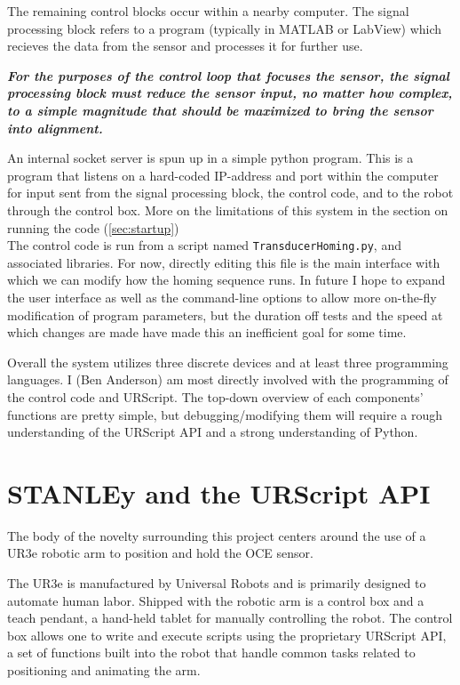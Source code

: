 \documentclass[11pt]{article}
\begin{document}
The remaining control blocks occur within a nearby computer. The signal processing block refers to a program (typically in MATLAB or LabView) which recieves the data from the sensor and processes it for further use. 

\textbf{\textit{For the purposes of the control loop that focuses the sensor, the signal processing block must reduce the sensor input, no matter how complex, to a simple magnitude that should be maximized to bring the sensor into alignment.}}

An internal socket server is spun up in a simple python program. This is a program that listens on a hard-coded IP-address and port within the computer for input sent from the signal processing block, the control code, and to the robot through the control box. More on the limitations of this system in the section on running the code (\autoref{sec:startup})\\

The control code is run from a script named \texttt{TransducerHoming.py}, and associated libraries. For now, directly editing this file is the main interface with which we can modify how the homing sequence runs.
In future I hope to expand the user interface as well as the command-line options to allow more on-the-fly modification of program parameters, but the duration off tests and the speed at which changes are made have made this an inefficient goal for some time.

Overall the system utilizes three discrete devices and at least three programming languages. I (Ben Anderson) am most directly involved with the programming of the control code and URScript. The top-down overview of each components' functions are pretty simple, but debugging/modifying them will require a rough understanding of the URScript API and a strong understanding of Python.

\section{STANLEy and the URScript API}\label{sec:robot_summary}
The body of the novelty surrounding this project centers around the use of a UR3e robotic arm to position and hold the OCE sensor.

The UR3e is manufactured by Universal Robots and is primarily designed to automate human labor. Shipped with the robotic arm is a control box and a teach pendant, a hand-held tablet for manually controlling the robot. The control box allows one to write and execute scripts using the proprietary URScript API, a set of functions built into the robot that handle common tasks related to positioning and animating the arm.
\end{document}
